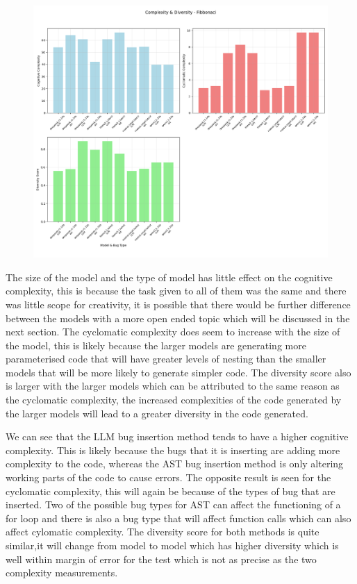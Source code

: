 \documentclass[12pt]{extarticle}
\begin{document}
\begin{figure}[H]
\centering
\includegraphics[width=0.7\linewidth]{Images/Complexity_Comparison_Fibbonaci.png}
\label{fig:Complexity_Benchmark}
\end{figure}

The size of the model and the type of model has little effect on the cognitive complexity, this is because the task given to all of them was the same and there was little scope for creativity, it is possible that there would be further difference between the models with a more open ended topic which will be discussed in the next section. The cyclomatic complexity does seem to increase with the size of the model, this is likely because the larger models are generating more parameterised code that will have greater levels of nesting than the smaller models that will be more likely to generate simpler code. The diversity score also is larger with the larger models which can be attributed to the same reason as the cyclomatic complexity, the increased complexities of the code generated by the larger models will lead to a greater diversity in the code generated.

We can see that the LLM bug insertion method tends to have a higher cognitive complexity. This is likely because the bugs that it is inserting are adding more complexity to the code, whereas the AST bug insertion method is only altering working parts of the code to cause errors. The opposite result is seen for the cyclomatic complexity, this will again be because of the types of bug that are inserted. Two of the possible bug types for AST can affect the functioning of a for loop and there is also a bug type that will affect function calls which can also affect cylomatic complexity. The diversity score for both methods is quite similar,it will change from model to model which has higher diversity which is well within margin of error for the test which is not as precise as the two complexity measurements.
\end{document}
